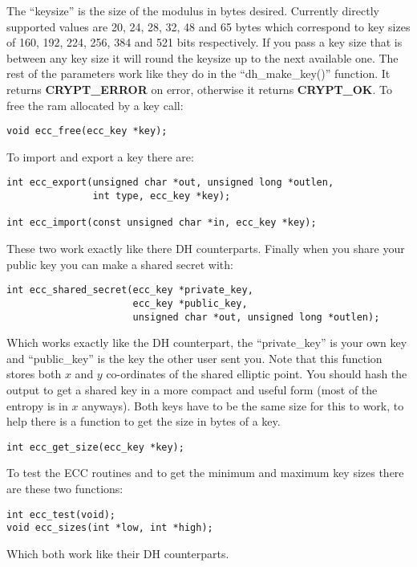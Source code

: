 \documentclass{book}
\begin{document}
The ``keysize'' is the size of the modulus in bytes desired.  Currently directly supported values are 20, 24, 28, 32, 48 and 65 bytes which
correspond to key sizes of 160, 192, 224, 256, 384 and 521 bits respectively.  If you pass a key size that is between any key size
it will round the keysize up to the next available one.  The rest of the parameters work like they do in the ``dh\_make\_key()'' function.  It returns
{\bf CRYPT\_ERROR} on error, otherwise it returns {\bf CRYPT\_OK}.  To free the ram allocated by a key call:
\begin{verbatim}
void ecc_free(ecc_key *key);
\end{verbatim}

To import and export a key there are: 
\begin{verbatim}
int ecc_export(unsigned char *out, unsigned long *outlen, 
               int type, ecc_key *key);

int ecc_import(const unsigned char *in, ecc_key *key);
\end{verbatim}
These two work exactly like there DH counterparts.  Finally when you share your public key you can make a shared secret
with:
\begin{verbatim}
int ecc_shared_secret(ecc_key *private_key, 
                      ecc_key *public_key, 
                      unsigned char *out, unsigned long *outlen);
\end{verbatim}
Which works exactly like the DH counterpart, the ``private\_key'' is your own key and ``public\_key'' is the key the other
user sent you.   Note that this function stores both $x$ and $y$ co-ordinates of the shared
elliptic point.  You should hash the output to get a shared key in a more compact and useful form (most of the entropy is 
in $x$ anyways).  Both keys have to be the same size for this to work, to help there is a function to get the size in bytes
 of a key.
\begin{verbatim}
int ecc_get_size(ecc_key *key);
\end{verbatim}

To test the ECC routines and to get the minimum and maximum key sizes there are these two functions:
\begin{verbatim}
int ecc_test(void);
void ecc_sizes(int *low, int *high);
\end{verbatim}
Which both work like their DH counterparts.
\end{document}
